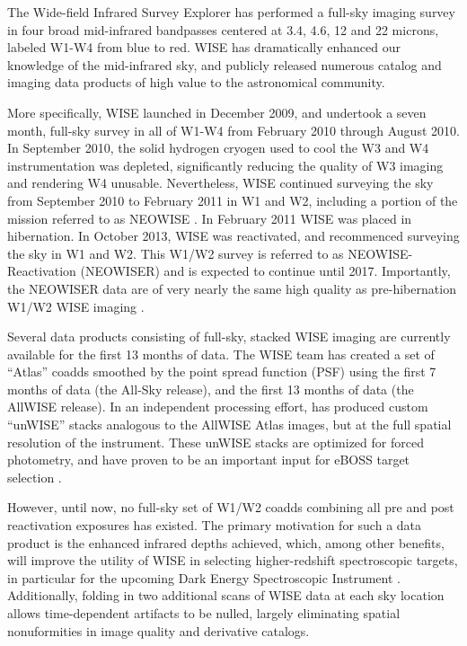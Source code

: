 \documentclass{emulateapj}
\begin{document}
The Wide-field Infrared Survey Explorer \cite[WISE; ][]{wright10} has performed
a full-sky imaging survey in four broad mid-infrared bandpasses centered at 
3.4, 4.6, 12 and 22 microns, labeled W1-W4 from blue to red. WISE has 
dramatically enhanced our knowledge of the mid-infrared sky, and publicly 
released numerous catalog and imaging data products of high value to the 
astronomical community.

More specifically, WISE launched in December 2009, and undertook a seven 
month, full-sky survey in all of W1-W4 from February 2010 through August
2010. In September 2010, the solid hydrogen cryogen used to cool the W3 and W4 
instrumentation was depleted, significantly reducing the quality of W3 
imaging and rendering W4 unusable. Nevertheless, WISE continued surveying 
the sky from September 2010 to February 2011 in W1 and W2, including 
a portion of the mission referred to as NEOWISE \citep{neowise}. In February 
2011 WISE was placed in hibernation. In October 2013, WISE was reactivated, and
recommenced surveying the sky in W1 and W2. This W1/W2 survey is referred to as 
NEOWISE-Reactivation (NEOWISER) and is expected to continue until 2017.
Importantly, the NEOWISER data are of very nearly the same high quality as
pre-hibernation W1/W2 WISE imaging \citep{neowiser}.

Several data products consisting of full-sky, stacked WISE imaging are 
currently available for the first 13 months of data. The WISE team has created 
a set of ``Atlas'' coadds smoothed by the point spread function (PSF) using the
first 7 months of data (the All-Sky release), and the first 13 months of data 
(the AllWISE release). In an independent processing effort, \cite{lang14} has 
produced custom ``unWISE'' stacks analogous to the AllWISE Atlas images, but at
the full spatial resolution of the instrument. These unWISE stacks are 
optimized for forced photometry, and have proven to be an important input for 
eBOSS target selection \citep{lang14b, eboss_qso, eboss_lrg}.

However, until now, no full-sky set of W1/W2 coadds combining all pre and post 
reactivation exposures has existed. The primary motivation for such a data 
product is the enhanced infrared depths achieved, which, among
other benefits, will improve the utility of WISE in selecting higher-redshift 
spectroscopic targets, in particular for the upcoming Dark Energy Spectroscopic
Instrument \citep[DESI,][]{desi}. Additionally, folding in two additional scans
of WISE data at each sky location allows time-dependent artifacts to be nulled,
largely eliminating spatial nonuformities in image quality and derivative 
catalogs.
\end{document}

